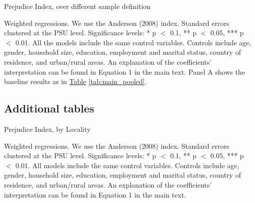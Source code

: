 \documentclass[a4paper,12pt]{article}
\renewcommand{\footnotesize}{\fontsize{8pt}{9pt}\selectfont}
\begin{document}
\begin{appendix}
\begin{table}[H]
	\footnotesize
	\caption{Prejudice Index, over different sample definition}
	\label{tab:het_emp}
	\centering
	\begin{threeparttable}
		
	\begin{tablenotes}
		\footnotesize
		\item Weighted regressions. We use the Anderson (2008) index. Standard errors clustered at the PSU level. Significance levels: * p $<$ 0.1, ** p $<$ 0.05, *** p $<$ 0.01. All the models include the same control variables. Controls include age, gender, household size, education, employment and marital status, country of residence, and urban/rural areas. An explanation of the coefficients' interpretation can be found in Equation 1 in the main text. Panel A shows the baseline results as in  \hyperref[tab:main_pooled]{Table} \ref{tab:main_pooled}.
	\end{tablenotes}
	\end{threeparttable}
\end{table} 

 
\subsection{Additional tables}\label{annex:het_locality}
 
 \begin{table}[H]
 	\footnotesize
 	\caption{Prejudice Index, by Locality}
 	\label{tab:prej_byLoc}
 	\centering
 	\begin{threeparttable}
 		
 	\begin{tablenotes}
 		\footnotesize
 		\item  Weighted regressions. We use the Anderson (2008) index. Standard errors clustered at the PSU level. Significance levels: * p $<$ 0.1, ** p $<$ 0.05, *** p $<$ 0.01. All models include the same control variables. Controls include age, gender, household size, education, employment and marital status, country of residence, and urban/rural areas.  An explanation of the coefficients' interpretation can be found in Equation 1 in the main text.
 	\end{tablenotes}
 	\end{threeparttable}
 \end{table} 


\end{appendix}
\end{document}
